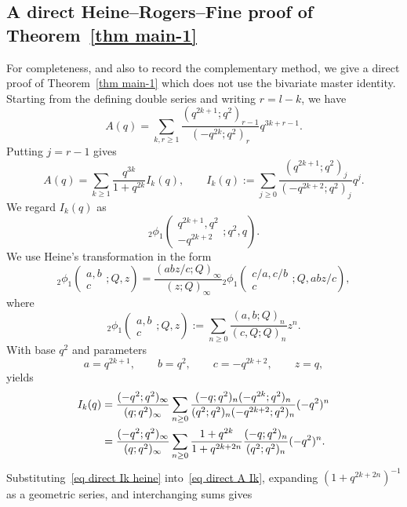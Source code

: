 \documentclass[10pt,a4paper]{amsart}
\numberwithin{equation}{section}
\begin{document}
\subsection{A direct Heine--Rogers--Fine proof of Theorem~\ref{thm main-1}}\label{sec direct proof main-1}
For completeness, and also to record the complementary method, we give a direct proof of Theorem~\ref{thm main-1} which does not use the bivariate master identity.  Starting from the defining double series and writing $r=l-k$, we have
\begin{equation}\label{eq direct A start}
A(q)=\sum_{k,r\ge 1}\frac{(q^{2k+1};q^2)_{r-1}}{(-q^{2k};q^2)_r}q^{3k+r-1}.
\end{equation}
Putting $j=r-1$ gives
\begin{equation}\label{eq direct A Ik}
A(q)=\sum_{k\ge1}\frac{q^{3k}}{1+q^{2k}}I_k(q),\qquad
I_k(q):=\sum_{j\ge0}\frac{(q^{2k+1};q^2)_j}{(-q^{2k+2};q^2)_j}q^j.
\end{equation}
We regard $I_k(q)$ as
\[
{}_{2}\phi_{1}\left(\begin{matrix}q^{2k+1},q^2\\-q^{2k+2}\end{matrix};q^2,q\right).
\]
We use Heine's transformation in the form
\[
{}_{2}\phi_{1}\left(\begin{matrix}a,b\\c\end{matrix};Q,z\right)
=\frac{(abz/c;Q)_\infty}{(z;Q)_\infty}
{}_{2}\phi_{1}\left(\begin{matrix}c/a,c/b\\c\end{matrix};Q,abz/c\right),
\]
where
\[
{}_{2}\phi_{1}\left(\begin{matrix}a,b\\c\end{matrix};Q,z\right)
:=\sum_{n\ge0}\frac{(a,b;Q)_n}{(c,Q;Q)_n}z^n.
\]
With base $q^2$ and parameters
\[
a=q^{2k+1},\qquad b=q^2,\qquad c=-q^{2k+2},\qquad z=q,
\]
yields
\begin{align}
I_k(q)
&=\frac{(-q^2;q^2)_\infty}{(q;q^2)_\infty}
\sum_{n\ge0}\frac{(-q;q^2)_n(-q^{2k};q^2)_n}{(q^2;q^2)_n(-q^{2k+2};q^2)_n}(-q^2)^n \notag\\
&=\frac{(-q^2;q^2)_\infty}{(q;q^2)_\infty}
\sum_{n\ge0}\frac{1+q^{2k}}{1+q^{2k+2n}}\frac{(-q;q^2)_n}{(q^2;q^2)_n}(-q^2)^n . \label{eq direct Ik heine}
\end{align}
Substituting~\eqref{eq direct Ik heine} into~\eqref{eq direct A Ik}, expanding
$(1+q^{2k+2n})^{-1}$ as a geometric series, and interchanging sums gives
\end{document}
